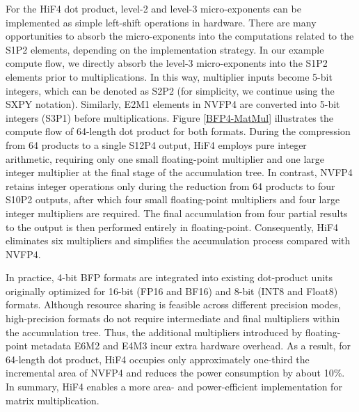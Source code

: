 For the HiF4 dot product, level-2 and level-3 micro-exponents 
can be implemented as simple left-shift operations in hardware. 
There are many opportunities to absorb the micro-exponents into 
the computations related to the S1P2 elements, 
depending on the implementation strategy. 
In our example compute flow, we directly absorb the level-3 
micro-exponents into the S1P2 elements prior to multiplications. 
In this way, multiplier inputs become 5-bit integers, 
which can be denoted as S2P2 (for simplicity, we continue using 
the SXPY notation). 
Similarly, E2M1 elements in NVFP4 are converted into 
5-bit integers (S3P1) before multiplications. 
Figure \ref{BFP4-MatMul} illustrates the compute flow of 
64-length dot product for both formats. 
During the compression from 64 products to a single S12P4 output, 
HiF4 employs pure integer arithmetic, 
requiring only one small floating-point multiplier and one large 
integer multiplier at the final stage of the accumulation tree. 
In contrast, NVFP4 retains integer operations only during the 
reduction from 64 products to four S10P2 outputs, after which four  
small floating-point multipliers and four large integer multipliers 
are required. 
The final accumulation from four partial results to the output is 
then performed entirely in floating-point. 
Consequently, HiF4 eliminates six multipliers and simplifies the 
accumulation process compared with NVFP4. 

In practice, 4-bit BFP formats are integrated into 
existing dot-product units originally optimized for 16-bit 
(FP16 and BF16) and 8-bit (INT8 and Float8) formats. 
Although resource sharing is feasible across different precision 
modes, high-precision formats do not require intermediate and final 
multipliers within the accumulation tree. 
Thus, the additional multipliers introduced by floating-point 
metadata E6M2 and E4M3 incur extra hardware overhead. 
As a result, for 64-length dot product, HiF4 occupies only 
approximately one-third the incremental area of NVFP4 and reduces 
the power consumption by about 10\%. 
In summary, HiF4 enables a more area- and power-efficient 
implementation for matrix multiplication. 
